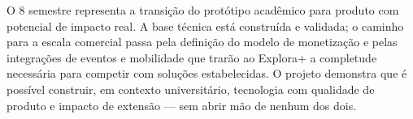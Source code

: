 \documentclass[12pt, a4paper]{article}
\begin{document}
O 8\textordmasculine{} semestre representa a transi\c{c}\~ao do prot\'otipo acad\^emico para produto com potencial de impacto real. A base t\'ecnica est\'a constru\'ida e validada; o caminho para a escala comercial passa pela defini\c{c}\~ao do modelo de monetiza\c{c}\~ao e pelas integra\c{c}\~oes de eventos e mobilidade que trar\~ao ao Explora+ a completude necess\'aria para competir com solu\c{c}\~oes estabelecidas. O projeto demonstra que \'e poss\'ivel construir, em contexto universit\'ario, tecnologia com qualidade de produto e impacto de extens\~ao --- sem abrir m\~ao de nenhum dos dois.

\printbibliography[title={Refer\^encias}]
\end{document}
